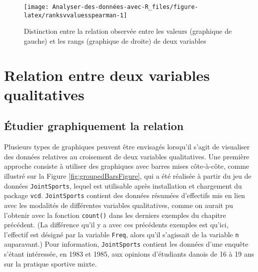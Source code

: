 \documentclass[
]{book}
\begin{document}
\begin{figure}

{\centering \texttt{[image: Analyser-des-données-avec-R\_files/figure-latex/ranksvvaluesspearman-1]} 

}

\caption{Distinction entre la relation observée entre les valeurs (graphique de gauche) et les rangs (graphique de droite) de deux variables}\label{fig:ranksvvaluesspearman}
\end{figure}

\hypertarget{relation-entre-deux-variables-qualitatives}{%
\section{Relation entre deux variables qualitatives}\label{relation-entre-deux-variables-qualitatives}}

\hypertarget{uxe9tudier-graphiquement-la-relation-1}{%
\subsection{Étudier graphiquement la relation}\label{uxe9tudier-graphiquement-la-relation-1}}

Plusieurs types de graphiques peuvent être envisagés lorsqu'il s'agit de visualiser des données relatives au croisement de deux variables qualitatives. Une première approche consiste à utiliser des graphiques avec barres mises côte-à-côte, comme illustré sur la Figure \ref{fig:groupedBarsFigure}, qui a été réalisée à partir du jeu de données \texttt{JointSports}, lequel est utilisable après installation et chargement du package \texttt{vcd}. \texttt{JointSports} contient des données résumées d'effectifs mis en lien avec les modalités de différentes variables qualitatives, comme on aurait pu l'obtenir avec la fonction \texttt{count()} dans les derniers exemples du chapitre précédent. (La différence qu'il y a avec ces précédents exemples est qu'ici, l'effectif est désigné par la variable \texttt{Freq}, alors qu'il s'agissait de la variable \texttt{n} auparavant.) Pour information, \texttt{JointSports} contient les données d'une enquête s'étant intéressée, en 1983 et 1985, aux opinions d'étudiants danois de 16 à 19 ans sur la pratique sportive mixte.
\end{document}
